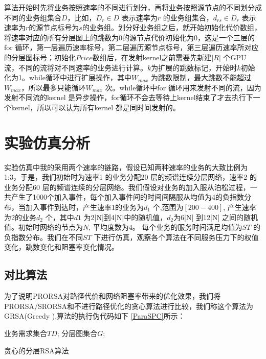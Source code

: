 算法开始时先将业务按照速率的不同进行划分，再将业务按照源节点的不同划分成不同的业务组集合$D$，比如，$D_r \in D$ 表示速率为$r$ 的业务组集合，$d_{rs} \in D_r$ 表示速率为$r$的源节点标号为$s$的业务组。划分好业务组之后，就开始初始化代价数组，将速率对应的所有分层图上的跳数为0的源节点代价初始化为0，这是一个三层的for 循环，第一层遍历速率标号，第二层遍历源节点标号，第三层遍历速率所对应的分层图标号；初始化$Price$数组后，在发射kernel之前需要先新建$|R|$ 个GPU 流，不同的流将对不同速率的业务进行计算。$k$为扩展的跳数标记，开始时$k$初始化为1。while循环中进行扩展操作，其中$W_{max}$ 为跳数限制，最大跳数不能超过$W_{max}$，所以最多只能循环$W_{max}$ 次。while循环中for 循环用来发射不同的流，因为发射不同流的kernel 是异步操作，for循环不会去等待上kernel结束了才去执行下一个kernel，所以可以认为所有kernel 都是同时间发射的。
\section{实验仿真分析}

实验仿真中我的采用两个速率的链路，假设已知两种速率的业务的大致比例为1:3，于是，我们初始时为速率1 的业务分配20 层的频谱连续分层网络，速率2 的业务分配60 层的频谱连续的分层网络。我们假设对业务的加入服从泊松过程，一共产生了1000个加入事件，每个加入事件间的时间间隔服从均值为4的负指数分布，当加入事件到达时，产生速率1的业务为$d_1$ 个,范围为$[200-400]$, 产生速率为2的业务$d_2$ 个，其中$d1$ 为2|N|到4|N|中的随机值，$d_2$为6|N| 到12|N| 之间的随机值。初始时网络的节点为$N$, 平均度数为$4$。 每个业务的服务时间满足均值为$ST$ 的负指数分布。我们在不同$ST$ 下进行仿真，观察各个算法在不同服务压力下的权值变化，跳数变化和阻塞率变化情况。
\subsection{对比算法}

为了说明PRORSA对路径代价和网络阻塞率带来的优化效果，我们将PRORSA/SRORSA和不进行路径优化的贪心算法进行比较，我们称这个算法为GRSA(Greedy ),算法的执行伪代码如下 \ref{ParaSPC}所示：
\begin{algorithm}[t]
\begin{algorithmic}[1]
\Require
业务需求集合$TD$;
分层图集合$G$;
\EndIf
\EndFor
{}
\EndIf
\EndFor
\EndFor
\EndFor
\end{algorithmic}
\caption{{贪心的分层RSA算法}}
\label{ParaSPC}
\end{algorithm}

